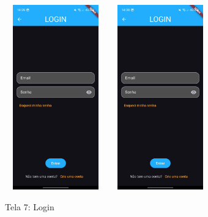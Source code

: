     \begin{figure}[h]
        \centering
        \includegraphics[width=44mm,height=80mm]{imagens/login.jpg} %
        \hspace{10mm}
        \includegraphics[width=44mm,height=80mm]{imagens/login.jpg} %
        \caption{\scriptsize Tela 7: Login}
        \footnotesize  {}
        \label{fig:tela7-recuperacao}
    \end{figure}

    \FloatBarrier
